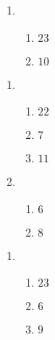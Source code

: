 \documentclass[12pt,twoside]{article}
\makeatletter
\def\emptycleardoublepage{\clearpage\if@twoside \ifodd\c@page\else
\thispagestyle{empty}%
\hbox{}\newpage\if@twocolumn\hbox{}\newpage\fi\fi\fi}
\makeatother
\begin{document}
\begin{multicols}{2}
\begin{enumerate}
\item \begin{enumerate}
\def \a{6}\def \b{17}\def \apb{23}
\item $\apb$
\def \a{2}\def \b{8}\def \ab{10}
\item $\ab$
\def \vshift{-5}\def \hshift{4}\def \chang{2}\def \findval{6}\def \yval{-9}
\end{enumerate}
\end{enumerate}\end{multicols}\emptycleardoublepage{}\graphicspath{{C:/Users/iainc/anaconda3/Randomizer/Sample Course/Sample Assessment 2/}}\begin{multicols}{2} \begin{enumerate}
\item \begin{enumerate}
\def \a{6}\def \b{16}\def \apb{22}
\item $\apb$
\def \a{14}\def \dif{7}\def \b{7}
\item $\dif$
\def \a{3}\def \b{8}\def \ab{11}
\item $\ab$
\def \vshift{1}\def \hshift{-4}\def \chang{2}\def \findval{-2}\def \yval{-3}
\end{enumerate}

\item \begin{enumerate}
\def \a{12}\def \dif{6}\def \b{6}
\item $\dif$
\def \a{2}\def \b{6}\def \ab{8}
\item $\ab$
\def \vshift{1}\def \hshift{-2}\def \chang{1}\def \findval{-1}\def \yval{-1}
\end{enumerate}
\end{enumerate}\end{multicols}\emptycleardoublepage{}\graphicspath{{C:/Users/iainc/anaconda3/Randomizer/Sample Course/Sample Assessment 2/}}\begin{multicols}{2} \begin{enumerate}
\item \begin{enumerate}
\def \a{6}\def \b{17}\def \apb{23}
\item $\apb$
\def \a{10}\def \dif{6}\def \b{4}
\item $\dif$
\def \a{3}\def \b{6}\def \ab{9}
\item $\ab$
\def \vshift{1}\def \hshift{-4}\def \chang{0}\def \findval{-4}\def \yval{1}
\end{enumerate}


\end{enumerate}
\end{multicols}
\end{document}
